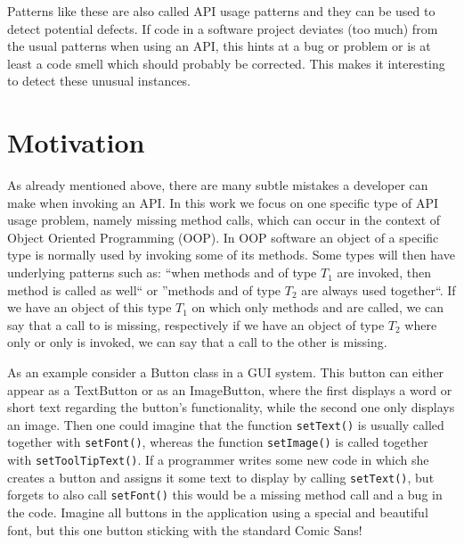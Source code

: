 Patterns like these are also called API usage patterns \cite{robillard2013automated} and they can be used to detect potential defects.
If code in a software project deviates (too much) from the usual patterns when using an API, this hints at a bug or problem or is at least a code smell which should probably be corrected.
This makes it interesting to detect these unusual instances.

\section{Motivation}

As already mentioned above, there are many subtle mistakes a developer can make when invoking an API.
In this work we focus on one specific type of API usage problem, namely missing method calls, which can occur in the context of Object Oriented Programming (OOP).
In OOP software an object of a specific type is normally used by invoking some of its methods.
Some types will then have underlying patterns such as: ``when methods  and  of type $T_1$ are invoked, then method  is called as well`` or ''methods  and  of type $T_2$ are always used together``.
If we have an object of this type $T_1$ on which only methods  and  are called, we can say that a call to  is missing, respectively if we have an object of type $T_2$ where only  or only  is invoked, we can say that a call to the other is missing.

As an example consider a Button class in a GUI system.
This button can either appear as a TextButton or as an ImageButton, where the first displays a word or short text regarding the button's functionality, while the second one only displays an image.
Then one could imagine that the function \texttt{setText()} is usually called together with \texttt{setFont()}, whereas the function \texttt{setImage()} is called together with \texttt{setToolTipText()}.
If a programmer writes some new code in which she creates a button and assigns it some text to display by calling \texttt{setText()}, but forgets to also call \texttt{setFont()} this would be a missing method call and a bug in the code.
Imagine all buttons in the application using a special and beautiful font, but this one button sticking with the standard Comic Sans!


